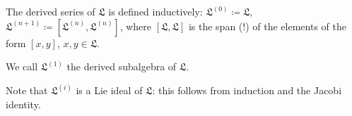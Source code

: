 The derived series of $\mathfrak{L}$ is defined inductively:
$\mathfrak{L}^{(0)}\coloneqq \mathfrak{L}$,
$\mathfrak{L}^{(n+1)}\coloneqq [\mathfrak{L}^{(n)}, \mathfrak{L}^{(n)}]$,
where $[\mathfrak{L}, \mathfrak{L}]$ is the span (!) of the elements of the
form $[x, y]$, $x, y \in \mathfrak{L}$.

We call $\mathfrak{L}^{(1)}$ the derived subalgebra of $\mathfrak{L}$.

Note that $\mathfrak{L}^{(i)}$ is a Lie ideal of $\mathfrak{L}$: this follows
from induction and the Jacobi identity.
